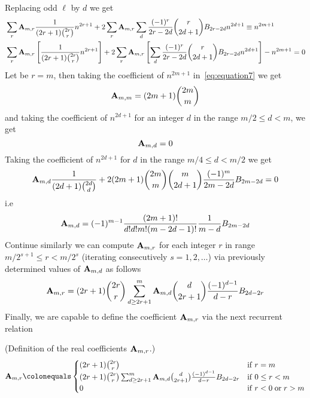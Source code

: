 Replacing odd $\ell$ by $d$ we get
\begin{equation}
    \begin{split}
        &\sum_{r} {\mathbf{A}} \sb{m,r} \frac{1}{(2r+1) \binom{2r}r} n^{2r+1}
        + 2 \sum_{r} {\mathbf{A}} \sb{m,r} \sum_{d} \frac{(-1)^r}{2r-2d} \binom{r}{2d+1} {B}\sb{2r-2d} n^{2d+1}
        \equiv n^{2m+1} \\
        &\sum_{r} {\mathbf{A}} \sb{m,r} \left[ \frac{1}{(2r+1) \binom{2r}r} n^{2r+1} \right]
        + 2 \sum_{r} {\mathbf{A}} \sb{m,r} \left[ \sum_{d} \frac{(-1)^r}{2r-2d} \binom{r}{2d+1} {B}\sb{2r-2d} n^{2d+1} \right]
        - n^{2m+1} = 0
    \end{split}\label{eq:equation7}
\end{equation}
Let be $r=m$, then taking the coefficient of $n^{2m+1}$ in~\eqref{eq:equation7} we get
\begin{equation*}
    {\mathbf{A}} \sb{m,m} = (2m+1)\binom{2m}{m}
\end{equation*}
and taking the coefficient of $n^{2d+1}$ for an integer $d$ in the range $m/2 \leq d < m$, we get
\begin{equation*}
    {\mathbf{A}} \sb{m,d} = 0
\end{equation*}
Taking the coefficient of $n^{2d+1}$ for $d$ in the range $m/4 \leq d < m/2$ we get
\begin{equation*}
    {\mathbf{A}} \sb{m,d} \frac{1}{(2d+1) \binom{2d}{d}}
    +2 (2m+1) \binom{2m}{m}\binom{m}{2d+1} \frac{(-1)^m}{2m-2d} {B}\sb{2m-2d} = 0
\end{equation*}
i.e
\begin{equation*}
    {\mathbf{A}} \sb{m,d} = (-1)^{m-1} \frac{(2m+1)!}{d!d!m!(m-2d-1)!} \frac{1}{m-d} {B}\sb{2m-2d}
\end{equation*}
Continue similarly we can compute ${\mathbf{A}} \sb{m,r}$ for each integer $r$ in range $m/2^{s+1}\leq r < m/2^s$
(iterating consecutively $s=1,2,\ldots$) via previously determined values of ${\mathbf{A}} \sb{m,d}$ as follows
\begin{equation*}
    {\mathbf{A}} \sb{m,r} =
    (2r+1) \binom{2r}{r} \sum_{d \geq 2r+1}^{m} {\mathbf{A}} \sb{m,d} \binom{d}{2r+1} \frac{(-1)^{d-1}}{d-r}
    {B}\sb{2d-2r}
\end{equation*}
Finally, we are capable to define the coefficient ${\mathbf{A}} \sb{m,r}$ via the next recurrent relation
\begin{defn} (Definition of the real coefficients ${\mathbf{A}} \sb{m,r}$.)
    \begin{equation}
        \label{eq:definition_coefficient_a}
        \coeffA{m}{r} \colonequals
        \begin{cases}
        (2r+1)
            \binom{2r}{r} & \mathrm{if} \; r=m \\
            (2r+1) \binom{2r}{r} \sum_{d \geq 2r+1}^{m} \coeffA{m}{d} \binom{d}{2r+1} \frac{(-1)^{d-1}}{d-r}
            \bernoulli{2d-2r} & \mathrm{if} \; 0 \leq r<m \\
            0 & \mathrm{if} \; r<0 \; \mathrm{or} \; r>m
        \end{cases}
    \end{equation}
\end{defn}
